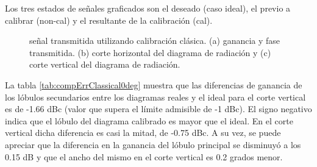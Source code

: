 Los tres estados de señales graficados son el deseado (caso ideal), el previo a calibrar (non-cal) y el resultante de la
calibración (cal).
\begin{figure}[H]
	\centering

	\caption{señal transmitida utilizando calibración clásica. (a) ganancia y fase transmitida. (b) corte horizontal del 
	diagrama de radiación y (c) corte vertical del diagrama de radiación.}
	\label{fig:compErrClassical0deg}
\end{figure}
La tabla \ref{tab:compErrClassical0deg} muestra que las diferencias de ganancia de los lóbulos secundarios entre los diagramas 
reales y el ideal para el corte vertical es de -1.66 dBc (valor que supera el límite admisible de -1 dBc). El signo negativo
indica que el lóbulo del diagrama calibrado es mayor que el ideal. En el corte vertical dicha diferencia es casi la mitad, de
-0.75 dBc. A su vez, se puede apreciar que la diferencia en la ganancia del lóbulo principal se disminuyó a los 0.15 dB y que el
ancho del mismo en el corte vertical es 0.2 grados menor.

